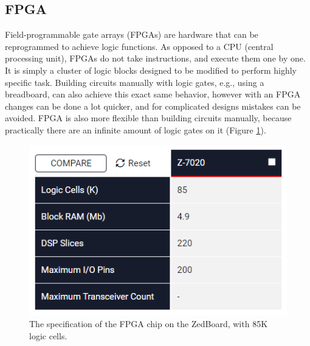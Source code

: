 \documentclass{article}
\begin{document}
	\subsection{FPGA}
		Field-programmable gate arrays (FPGAs) are hardware that can be reprogrammed to achieve logic functions. As opposed to a CPU (central processing unit), FPGAs do not take instructions, and execute them one by one. It is simply a cluster of logic blocks designed to be modified to perform highly specific task. Building circuits manually with logic gates, e.g., using a breadboard, can also achieve this exact same behavior, however with an FPGA changes can be done a lot quicker, and for complicated designs mistakes can be avoided. FPGA is also more flexible than building circuits manually, because practically there are an infinite amount of logic gates on it (Figure \ref{zynq7020}).
	\begin{figure}[h]
		\centering
		\includegraphics[scale=1]{zynq7020}
		\caption{The specification of the FPGA chip on the ZedBoard, with 85K logic cells.}
		\label{zynq7020}
	\end{figure}
		\\
		
\end{document}
